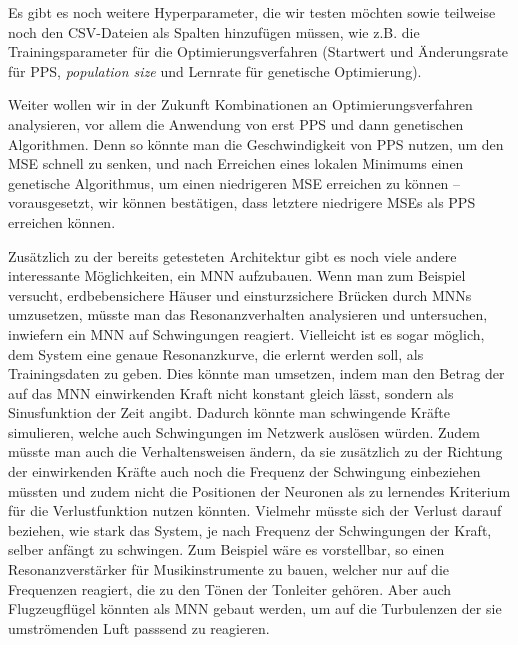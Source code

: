 \documentclass[10pt]{scrartcl}
\newcommand*{\eng}[1]{\textit{#1}}
\begin{document}

Es gibt es noch weitere Hyperparameter, die wir testen möchten sowie teilweise noch den CSV-Dateien als Spalten hinzufügen müssen, wie z.B. die Trainingsparameter für die Optimierungsverfahren (Startwert und Änderungsrate für PPS, \eng{population size} und Lernrate für genetische Optimierung).

Weiter wollen wir in der Zukunft Kombinationen an Optimierungsverfahren analysieren, vor allem die Anwendung von erst PPS und dann genetischen Algorithmen.
Denn so könnte man die Geschwindigkeit von PPS nutzen, um den MSE schnell zu senken, und nach Erreichen eines lokalen Minimums einen genetische Algorithmus, um einen niedrigeren MSE erreichen zu können -- vorausgesetzt, wir können bestätigen, dass letztere niedrigere MSEs als PPS erreichen können. 

Zusätzlich zu der bereits getesteten Architektur gibt es noch viele andere interessante Möglichkeiten, ein MNN aufzubauen.
Wenn man zum Beispiel versucht, erdbebensichere Häuser und einsturzsichere Brücken durch MNNs umzusetzen, müsste man das Resonanzverhalten analysieren und untersuchen, inwiefern ein MNN auf Schwingungen reagiert.
Vielleicht ist es sogar möglich, dem System eine genaue Resonanzkurve, die erlernt werden soll, als Trainingsdaten zu geben.
Dies könnte man umsetzen, indem man den Betrag der auf das MNN einwirkenden Kraft nicht konstant gleich lässt, sondern als Sinusfunktion der Zeit angibt.
Dadurch könnte man schwingende Kräfte simulieren, welche auch Schwingungen im Netzwerk auslösen würden.
Zudem müsste man auch die Verhaltensweisen ändern, da sie zusätzlich zu der Richtung der einwirkenden Kräfte auch noch die Frequenz der Schwingung einbeziehen müssten und zudem nicht die Positionen der Neuronen als zu lernendes Kriterium für die Verlustfunktion nutzen könnten.
Vielmehr müsste sich der Verlust darauf beziehen, wie stark das System, je nach Frequenz der Schwingungen der Kraft, selber anfängt zu schwingen.
Zum Beispiel wäre es vorstellbar, so einen Resonanzverstärker für Musikinstrumente zu bauen, welcher nur auf die Frequenzen reagiert, die zu den Tönen der Tonleiter gehören.
Aber auch Flugzeugflügel könnten als MNN gebaut werden, um auf die Turbulenzen der sie umströmenden Luft passsend zu reagieren.
\end{document}
